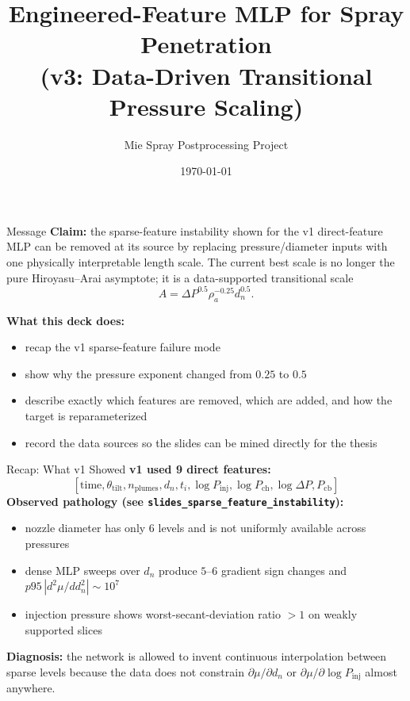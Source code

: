 \documentclass[UTF8,aspectratio=169]{ctexbeamer}
\title[Engineered Feature v3]{Engineered-Feature MLP for Spray Penetration\\ (v3: Data-Driven Transitional Pressure Scaling)}
\author{Mie Spray Postprocessing Project}
\date{\today}
\newcommand{\good}[1]{\textcolor{green!45!black}{#1}}
\begin{document}
\begin{frame}
  \titlepage
\end{frame}

\begin{frame}{Message}
\textbf{Claim:} the sparse-feature instability shown for the v1 direct-feature MLP can be removed at its source by replacing pressure/diameter inputs with one physically interpretable length scale. The current best scale is no longer the pure Hiroyasu--Arai asymptote; it is a \good{data-supported transitional scale}
\[
A=\Delta P^{0.5}\rho_a^{-0.25}d_n^{0.5}.
\]

\vspace{0.4em}
\textbf{What this deck does:}
\begin{itemize}
  \item recap the v1 sparse-feature failure mode
  \item show why the pressure exponent changed from \(0.25\) to \(0.5\)
  \item describe exactly which features are removed, which are added, and how the target is reparameterized
  \item record the data sources so the slides can be mined directly for the thesis
\end{itemize}
\end{frame}

\begin{frame}{Recap: What v1 Showed}
\textbf{v1 used 9 direct features:}
\[
[\text{time}, \theta_{\mathrm{tilt}}, n_{\mathrm{plumes}}, d_n, t_i, \log P_{\mathrm{inj}}, \log P_{\mathrm{ch}}, \log\Delta P, P_{\mathrm{cb}}]
\]
\textbf{Observed pathology (see \texttt{slides\_sparse\_feature\_instability}):}
\begin{itemize}
  \item nozzle diameter has only 6 levels and is not uniformly available across pressures
  \item dense MLP sweeps over $d_n$ produce $5$--$6$ gradient sign changes and $p95\,|d^2\mu/dd_n^2|\sim10^7$
  \item injection pressure shows worst-secant-deviation ratio $>1$ on weakly supported slices
\end{itemize}

\vspace{0.3em}
\textbf{Diagnosis:} the network is allowed to invent continuous interpolation between sparse levels because the data does not constrain $\partial\mu/\partial d_n$ or $\partial\mu/\partial\log P_{\mathrm{inj}}$ almost anywhere.
\end{frame}
\end{document}
